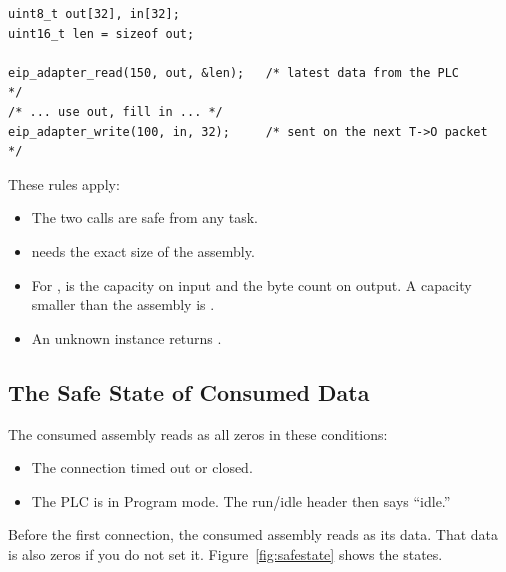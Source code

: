\begin{lstlisting}
uint8_t out[32], in[32];
uint16_t len = sizeof out;

eip_adapter_read(150, out, &len);   /* latest data from the PLC          */
/* ... use out, fill in ... */
eip_adapter_write(100, in, 32);     /* sent on the next T->O packet      */
\end{lstlisting}

These rules apply:

\begin{itemize}
  \item The two calls are safe from any task.
  \item {} needs the exact size of the assembly.
  \item For ,  is the capacity on input
        and the byte count on output. A capacity smaller than the assembly is
        .
  \item An unknown instance returns .
\end{itemize}

\subsection{The Safe State of Consumed Data}\label{sec:safestate}

The consumed assembly reads as all zeros in these conditions:

\begin{itemize}
  \item The connection timed out or closed.
  \item The PLC is in Program mode. The run/idle header then says ``idle.''
\end{itemize}

Before the first connection, the consumed assembly reads as its
 data. That data is also zeros if you do not set it.
Figure~\ref{fig:safestate} shows the states.

